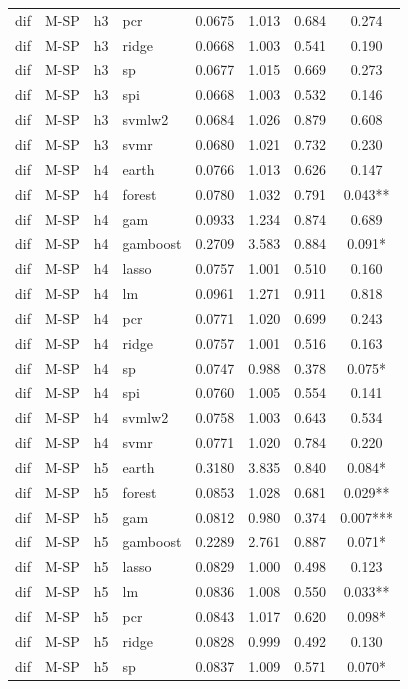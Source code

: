 \begin{ThreePartTable}
\begin{longtable}[t]{llclcccc}
dif & M-SP & h3 & pcr & 0.0675 & 1.013 & 0.684 & 0.274\\
dif & M-SP & h3 & ridge & 0.0668 & 1.003 & 0.541 & 0.190\\
dif & M-SP & h3 & sp & 0.0677 & 1.015 & 0.669 & 0.273\\
dif & M-SP & h3 & spi & 0.0668 & 1.003 & 0.532 & 0.146\\
dif & M-SP & h3 & svmlw2 & 0.0684 & 1.026 & 0.879 & 0.608\\
dif & M-SP & h3 & svmr & 0.0680 & 1.021 & 0.732 & 0.230\\
\addlinespace
dif & M-SP & h4 & earth & 0.0766 & 1.013 & 0.626 & 0.147\\
dif & M-SP & h4 & forest & 0.0780 & 1.032 & 0.791 & 0.043**\\
dif & M-SP & h4 & gam & 0.0933 & 1.234 & 0.874 & 0.689\\
dif & M-SP & h4 & gamboost & 0.2709 & 3.583 & 0.884 & 0.091*\\
dif & M-SP & h4 & lasso & 0.0757 & 1.001 & 0.510 & 0.160\\
dif & M-SP & h4 & lm & 0.0961 & 1.271 & 0.911 & 0.818\\
dif & M-SP & h4 & pcr & 0.0771 & 1.020 & 0.699 & 0.243\\
dif & M-SP & h4 & ridge & 0.0757 & 1.001 & 0.516 & 0.163\\
dif & M-SP & h4 & sp & 0.0747 & 0.988 & 0.378 & 0.075*\\
dif & M-SP & h4 & spi & 0.0760 & 1.005 & 0.554 & 0.141\\
dif & M-SP & h4 & svmlw2 & 0.0758 & 1.003 & 0.643 & 0.534\\
dif & M-SP & h4 & svmr & 0.0771 & 1.020 & 0.784 & 0.220\\
\addlinespace
dif & M-SP & h5 & earth & 0.3180 & 3.835 & 0.840 & 0.084*\\
dif & M-SP & h5 & forest & 0.0853 & 1.028 & 0.681 & 0.029**\\
dif & M-SP & h5 & gam & 0.0812 & 0.980 & 0.374 & 0.007***\\
dif & M-SP & h5 & gamboost & 0.2289 & 2.761 & 0.887 & 0.071*\\
dif & M-SP & h5 & lasso & 0.0829 & 1.000 & 0.498 & 0.123\\
dif & M-SP & h5 & lm & 0.0836 & 1.008 & 0.550 & 0.033**\\
dif & M-SP & h5 & pcr & 0.0843 & 1.017 & 0.620 & 0.098*\\
dif & M-SP & h5 & ridge & 0.0828 & 0.999 & 0.492 & 0.130\\
dif & M-SP & h5 & sp & 0.0837 & 1.009 & 0.571 & 0.070*\\

\end{longtable}
\end{ThreePartTable}
